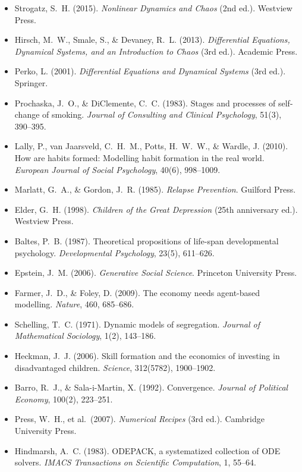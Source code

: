 \begin{itemize}[nosep, leftmargin=*]
\item Strogatz, S.~H. (2015). \textit{Nonlinear Dynamics and Chaos} (2nd ed.). Westview Press.
\item Hirsch, M.~W., Smale, S., \& Devaney, R.~L. (2013). \textit{Differential Equations, Dynamical Systems, and an Introduction to Chaos} (3rd ed.). Academic Press.
\item Perko, L. (2001). \textit{Differential Equations and Dynamical Systems} (3rd ed.). Springer.
\item Prochaska, J.~O., \& DiClemente, C.~C. (1983). Stages and processes of self-change of smoking. \textit{Journal of Consulting and Clinical Psychology}, 51(3), 390--395.
\item Lally, P., van Jaarsveld, C.~H.~M., Potts, H.~W.~W., \& Wardle, J. (2010). How are habits formed: Modelling habit formation in the real world. \textit{European Journal of Social Psychology}, 40(6), 998--1009.
\item Marlatt, G.~A., \& Gordon, J.~R. (1985). \textit{Relapse Prevention}. Guilford Press.
\item Elder, G.~H. (1998). \textit{Children of the Great Depression} (25th anniversary ed.). Westview Press.
\item Baltes, P.~B. (1987). Theoretical propositions of life-span developmental psychology. \textit{Developmental Psychology}, 23(5), 611--626.
\item Epstein, J.~M. (2006). \textit{Generative Social Science}. Princeton University Press.
\item Farmer, J.~D., \& Foley, D. (2009). The economy needs agent-based modelling. \textit{Nature}, 460, 685--686.
\item Schelling, T.~C. (1971). Dynamic models of segregation. \textit{Journal of Mathematical Sociology}, 1(2), 143--186.
\item Heckman, J.~J. (2006). Skill formation and the economics of investing in disadvantaged children. \textit{Science}, 312(5782), 1900--1902.
\item Barro, R.~J., \& Sala-i-Martin, X. (1992). Convergence. \textit{Journal of Political Economy}, 100(2), 223--251.
\item Press, W.~H., et al.~(2007). \textit{Numerical Recipes} (3rd ed.). Cambridge University Press.
\item Hindmarsh, A.~C. (1983). ODEPACK, a systematized collection of ODE solvers. \textit{IMACS Transactions on Scientific Computation}, 1, 55--64.
\end{itemize}

